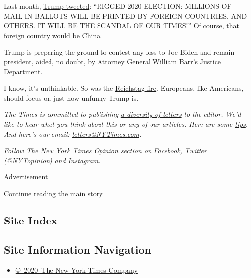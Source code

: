 Last month,
\href{https://twitter.com/realdonaldtrump/status/1275024974579982336}{Trump
tweeted}: ``RIGGED 2020 ELECTION: MILLIONS OF MAIL-IN BALLOTS WILL BE
PRINTED BY FOREIGN COUNTRIES, AND OTHERS. IT WILL BE THE SCANDAL OF OUR
TIMES!'' Of course, that foreign country would be China.

Trump is preparing the ground to contest any loss to Joe Biden and
remain president, aided, no doubt, by Attorney General William Barr's
Justice Department.

I know, it's unthinkable. So was the
\href{https://www.history.com/topics/germany/reichstag-fire}{Reichstag
fire}. Europeans, like Americans, should focus on just how unfunny Trump
is.

\emph{The Times is committed to publishing}
\href{https://www.nytimes3xbfgragh.onion/2019/01/31/opinion/letters/letters-to-editor-new-york-times-women.html}{\emph{a
diversity of letters}} \emph{to the editor. We'd like to hear what you
think about this or any of our articles. Here are some}
\href{https://help.nytimes3xbfgragh.onion/hc/en-us/articles/115014925288-How-to-submit-a-letter-to-the-editor}{\emph{tips}}\emph{.
And here's our email:}
\href{mailto:letters@NYTimes.com}{\emph{letters@NYTimes.com}}\emph{.}

\emph{Follow The New York Times Opinion section on}
\href{https://www.facebookcorewwwi.onion/nytopinion}{\emph{Facebook}}\emph{,}
\href{http://twitter.com/NYTOpinion}{\emph{Twitter (@NYTopinion)}}
\emph{and}
\href{https://www.instagram.com/nytopinion/}{\emph{Instagram}}\emph{.}

Advertisement

\protect\hyperlink{after-bottom}{Continue reading the main story}

\hypertarget{site-index}{%
\subsection{Site Index}\label{site-index}}

\hypertarget{site-information-navigation}{%
\subsection{Site Information
Navigation}\label{site-information-navigation}}

\begin{itemize}
\tightlist
\item
  \href{https://help.nytimes3xbfgragh.onion/hc/en-us/articles/115014792127-Copyright-notice}{©~2020~The
  New York Times Company}
\end{itemize}

